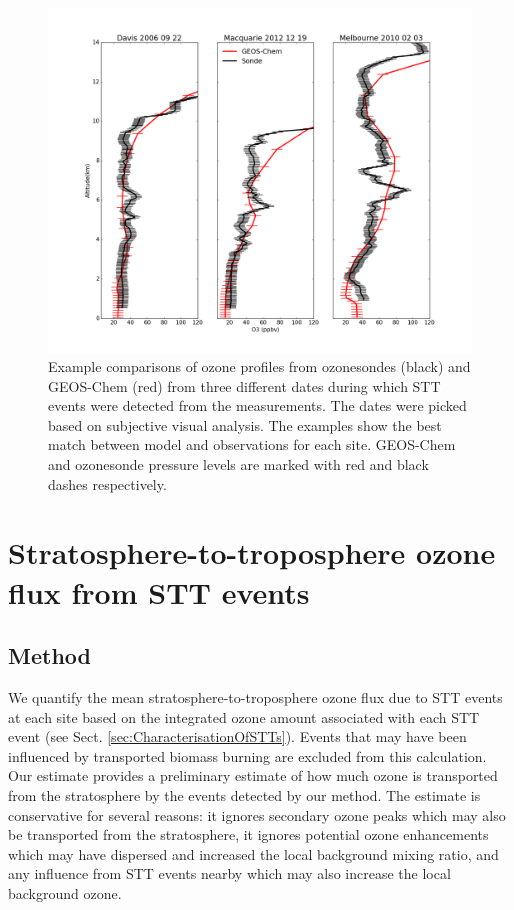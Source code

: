 \documentclass[acp, manuscript]{copernicus} %
\begin{document}
  \begin{figure}
    \includegraphics[width=12cm]{figures/event_profile_comparison.png}
    \caption{%
      Example comparisons of ozone profiles from ozonesondes (black) and GEOS-Chem (red) from three different dates during which STT events were detected from the measurements.
      The dates were picked based on subjective visual analysis. 
      The examples show the best match between model and observations for each site.
      GEOS-Chem and ozonesonde pressure levels are marked with red and black dashes respectively.}
    \label{fig:event_profile_comparison}
  \end{figure}
  
\section{Stratosphere-to-troposphere ozone flux from STT events}
  \label{sec:STTevents}
  \subsection{Method}
  \label{sec:fluxcalc}
    We quantify the mean stratosphere-to-troposphere ozone flux due to STT events at each site based on the integrated ozone amount associated with each STT event (see Sect. \ref{sec:CharacterisationOfSTTs}).
    Events that may have been influenced by transported biomass burning are excluded from this calculation.
    Our estimate provides a preliminary estimate of how much ozone is transported from the stratosphere by the events detected by our method.
    The estimate is conservative for several reasons: it ignores secondary ozone peaks which may also be transported from the stratosphere, it ignores potential ozone enhancements which may have dispersed and increased the local background mixing ratio, and any influence from STT events nearby which may also increase the local background ozone.
    
\end{document}
